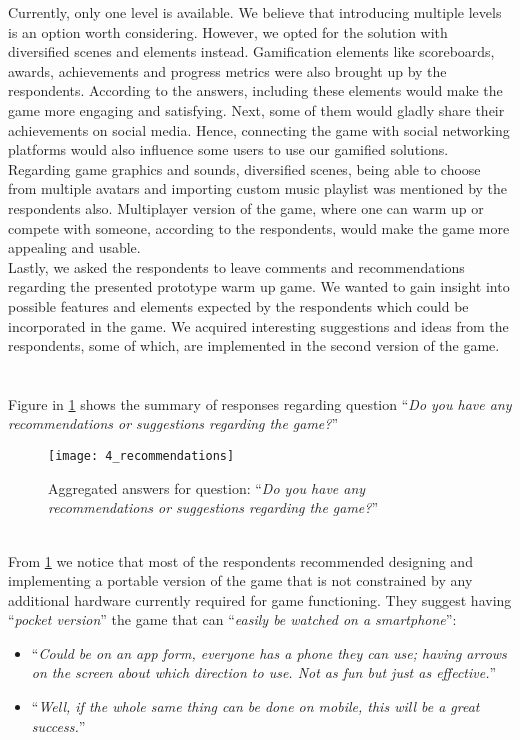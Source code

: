 Currently, only one level is available. We believe that introducing multiple levels is an option worth considering. However, we opted for the solution with diversified scenes and elements instead. Gamification elements like scoreboards, awards, achievements and progress metrics were also brought up by the respondents. According to the answers, including these elements would make the game more engaging and satisfying. Next, some of them would gladly share their achievements on social media. Hence, connecting the game with social networking platforms would also influence some users to use our gamified solutions. Regarding game graphics and sounds, diversified scenes, being able to choose from multiple avatars and importing custom music playlist was mentioned by the respondents also. Multiplayer version of the game, where one can warm up or compete with someone, according to the respondents, would make the game more appealing and usable.\\ 
Lastly, we asked the respondents to leave comments and recommendations regarding the presented prototype warm up game. We wanted to gain insight into possible features and elements expected by the respondents which could be incorporated in the game. We acquired interesting suggestions and ideas from the respondents, some of which, are implemented in the second version of the game.\\\\\\ Figure in \ref{fig:4_recommendations} shows the summary of responses regarding question ``\textit{Do you have any recommendations or suggestions regarding the game?}''\\
\begin{figure}[h]
    \centering
    \texttt{[image: 4\_recommendations]}
    \caption{Aggregated answers for question: ``\textit{Do you have any recommendations or suggestions regarding the game?}''}
    \label{fig:4_recommendations}
\end{figure}\\ 
From \ref{fig:4_recommendations} we notice that most of the respondents recommended designing and implementing a portable version of the game that is not constrained by any additional hardware currently required for game functioning. They suggest having ``\textit{pocket version}'' the game that can ``\textit{easily be watched on a smartphone}'':
\begin{itemize}
\item ``\textit{Could be on an app form, everyone has a phone they can use; having arrows on the screen about which direction to use. Not as fun but just as effective.}''
\item ``\textit{Well, if the whole same thing can be done on mobile, this will be a great success.}''
\end{itemize}
